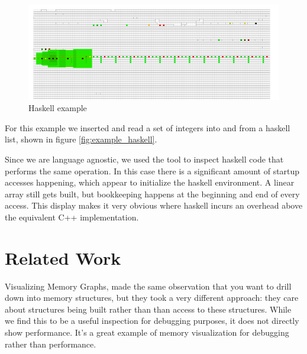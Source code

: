 \documentclass[annual]{acmsiggraph}
\begin{document}
  \begin{figure}[t]
		\centering
    \includegraphics[scale=0.45]{images/example_haskell.png}
		\caption{Haskell example}
    \label{fig:example_array}
	\end{figure}

  For this example we inserted and read a set of integers into and from a haskell list, shown in figure \ref{fig:example_haskell}.
  
  Since we are language agnostic, we used the tool to inspect haskell code that performs the same operation. In this case there is a significant amount of startup accesses happening, which appear to initialize the haskell environment. A linear array still gets built, but bookkeeping happens at the beginning and end of every access. This display makes it very obvious where haskell incurs an overhead above the equivalent C++ implementation.
  

\section{Related Work}\label{ch_r}

Visualizing Memory Graphs\cite{zimmerman:2001:VMG}, made the same observation that you want to drill down into memory structures, but they took a very different approach: they care about structures being built rather than than access to these structures. While we find this to be a useful inspection for debugging purposes, it does not directly show performance. It's a great example of memory visualization for debugging rather than performance.
\end{document}
